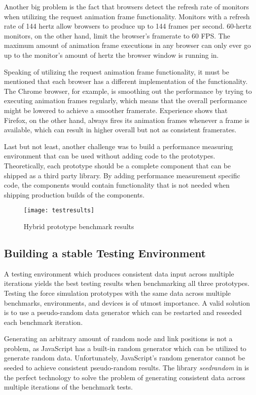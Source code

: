Another big problem is the fact that browsers detect the refresh rate of monitors when utilizing the request animation frame functionality. Monitors with a refresh rate of 144 hertz allow browsers to produce up to 144 frames per second. 60-hertz monitors, on the other hand, limit the browser's framerate to 60 FPS. The maximum amount of animation frame executions in any browser can only ever go up to the monitor's amount of hertz the browser window is running in. 

Speaking of utilizing the request animation frame functionality, it must be mentioned that each browser has a different implementation of the functionality. The Chrome browser, for example, is smoothing out the performance by trying to executing animation frames regularly, which means that the overall performance might be lowered to achieve a smoother framerate. Experience shows that Firefox, on the other hand, always fires its animation frames whenever a frame is available, which can result in higher overall but not as consistent framerates.

Last but not least, another challenge was to build a performance measuring environment that can be used without adding code to the prototypes. Theoretically, each prototype should be a complete component that can be shipped as a third party library. By adding performance measurement specific code, the components would contain functionality that is not needed when shipping production builds of the components.

\begin{figure}
  \centering
  \texttt{[image: testresults]}
  \caption{Hybrid prototype benchmark results}
  \label{fig:reactD3benchResult}
\end{figure}

\subsection{Building a stable Testing Environment}
\label{sub:perfImplDetails}

A testing environment which produces consistent data input across multiple iterations yields the best testing results when benchmarking all three prototypes. Testing the force simulation prototypes with the same data across multiple benchmarks, environments, and devices is of utmost importance. A valid solution is to use a pseudo-random data generator which can be restarted and reseeded each benchmark iteration.

Generating an arbitrary amount of random node and link positions is not a problem, as JavaScript has a built-in random generator which can be utilized to generate random data. Unfortunately, JavaScript's random generator cannot be seeded to achieve consistent pseudo-random results. The library \emph{seedrandom} in \cite{SeedRandom} is the perfect technology to solve the problem of generating consistent data across multiple iterations of the benchmark tests.

